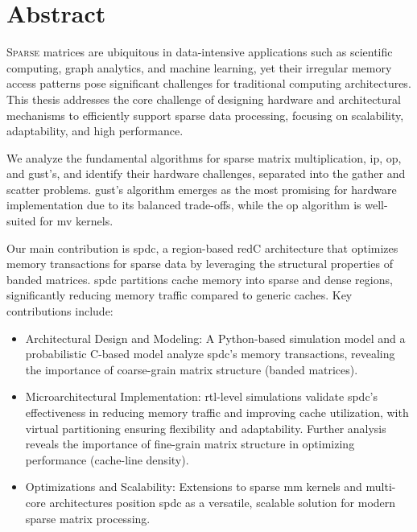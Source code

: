 
\if\Language\EN

\FancyHeadRight{\sectitle}

\renewcommand{\sectitle}{Abstract}

\addcontentsline{toc}{chapter}{\sectitle}
\chapter*{\sectitle}


\lettrine{S}{parse} matrices are ubiquitous in data-intensive applications such as scientific computing, graph analytics, and machine learning, yet their irregular memory access patterns pose significant challenges for traditional computing architectures.
This thesis addresses the core challenge of designing hardware and architectural mechanisms to efficiently support sparse data processing, focusing on scalability, adaptability, and high performance.

We analyze the fundamental algorithms for sparse matrix multiplication, \acrlong{ip}, \acrlong{op}, and \acrlong{gust}'s, and identify their hardware challenges, separated into the \gls{gather} and \gls{scatter} problems.
\acrlong{gust}'s algorithm emerges as the most promising for hardware implementation due to its balanced trade-offs, while the \acrlong{op} algorithm is well-suited for \acrlong{mv} kernels.

Our main contribution is \acrlong{spdc}, a region-based \acrlong{redC} architecture that optimizes memory transactions for sparse data by leveraging the structural properties of \gls{banded} matrices.
\acrlong{spdc} partitions cache memory into sparse and dense regions, significantly reducing memory traffic compared to generic caches.
Key contributions include:
\begin{itemize}
    \item Architectural Design and Modeling: A Python-based simulation model and a probabilistic C-based model analyze \acrlong{spdc}'s memory transactions, revealing the importance of coarse-grain matrix structure (\ex \gls{banded} matrices).
    \item Microarchitectural Implementation: \acrshort{rtl}-level simulations validate \acrlong{spdc}'s effectiveness in reducing memory traffic and improving cache utilization, with virtual partitioning ensuring flexibility and adaptability.
    Further analysis reveals the importance of fine-grain matrix structure in optimizing performance (\eg cache-line density).
    \item Optimizations and Scalability: Extensions to sparse \acrlong{mm} kernels and multi-core architectures position \acrlong{spdc} as a versatile, scalable solution for modern sparse matrix processing.
\end{itemize}

